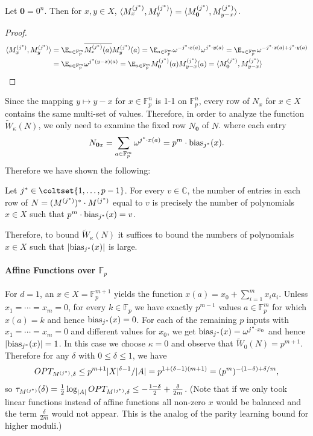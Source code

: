 \begin{proposition}
\label{c-prop:equalrows}
Let $\mathbf{0}=0^n$.
Then for $x,y\in X$,
$\langle M^{(j^*)}_x,M^{(j^*)}_y\rangle=\langle M^{(j^*)}_{\mathbf{0}},M^{(j^*)}_{y-x}\rangle$.
\end{proposition}

\begin{proof}
\begin{align*}
\langle \mjs_x,\mjs_y\rangle&=\E_{a\in \mathbb{F}_p^m} \overline {\mjs_x(a)}\mjs_y(a)
=\E_{a\in \mathbb{F}_p^m} \omega^{-j^*\cdot x(a)}\omega^{j^*\cdot y(a)}
=\E_{a\in \mathbb{F}_p^m} \omega^{-j^*\cdot x(a)+j^*\cdot y(a)}\\
&=\E_{a\in \mathbb{F}_p^m} \omega^{j^*(y-x)(a)}
=\E_{a\in \mathbb{F}_p^m} \mjs_{\mathbf{0}}(a)\mjs_{y-x}(a)
=\langle \mjs_{\mathbf{0}},\mjs_{y-x}\rangle
\end{align*}
\end{proof}

Since the mapping $y\mapsto y-x$ for $x\in \mathbb{F}_p^n$ is
1-1 on $\mathbb{F}_p^n$, 
every row of $N_x$ for $x\in X$ contains the same multi-set of values.
Therefore, in order to analyze the function $\tilde W_\kappa(N)$,
we only need to examine the fixed row $N_\mathbf{0}$ of $N$.
where each entry
$$N_{\mathbf{0}x}=\sum_{a\in \mathbb{F}_p^m}\omega^{j^*\cdot x(a)}=p^m\cdot \mathrm{bias}_{j^*}(x).$$
Therefore we have shown the following:

\begin{lemma}
\label{lem:matrix-bias}
Let $j^*\in \coltset{1,\ldots,p-1}$.  For every $v\in \mathbb{C}$, the number of
entries in each row of $N=(M^{(j^*)})^*\cdot M^{(j^*)}$ equal to $v$ is precisely
the number of polynomials $x\in X$ such that $p^m\cdot \mathrm{bias}_{j^*}(x)=v$. 
\end{lemma}

Therefore, to bound $\tilde W_\kappa(N)$ it suffices to bound the numbers of
polynomials $x\in X$ such that $|\mathrm{bias}_{j^*}(x)|$ is large.

\paragraph{Affine Functions over $\mathbb{F}_p$}

For $d=1$, an $x\in X=\mathbb{F}_p^{m+1}$ yields the function
$x(a)=x_0+\sum_{i=1}^m x_i a_i$.  Unless $x_1=\cdots=x_m=0$, for every 
$k\in \mathbb{F}_p$ we have exactly $p^{m-1}$ values $a\in \mathbb{F}_p^m$
for which $x(a)=k$ and hence $\mathrm{bias}_{j^*}(x)=0$.
For each of the remaining $p$ inputs with $x_1=\cdots=x_m=0$
and different values for $x_0$, we get $\mathrm{bias}_{j^*}(x)=\omega^{j^*\cdot x_0}$
and hence $|\mathrm{bias}_{j^*}(x)|=1$.
In this case we choose $\kappa=0$ and observe that $\tilde W_0(N)=p^{m+1}$.
Therefore for any $\delta$ with $0\le \delta\le 1$, we have
$$OPT_{M^{(j^*)},\delta}\le p^{m+1} |X|^{\delta-1}/|A|=p^{1+(\delta-1)(m+1)}=(p^m)^{-(1-\delta)+\delta/m},$$
so $\tau_{M^{(j^*)}}(\delta)=\frac12 \log_{|A|} OPT_{M^{(j^*)},\delta}\le -\frac{1-\delta}2+\frac{\delta}{2m}$.
(Note that if we only took linear functions instead of affine functions
all non-zero $x$ would be balanced and the term $\frac{\delta}{2m}$ would not
appear. This is the analog of the parity learning bound for higher moduli.)

